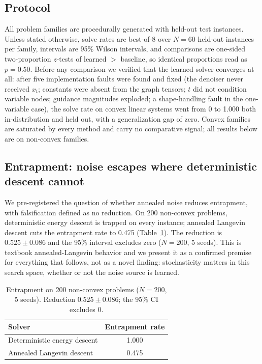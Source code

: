 \documentclass[11pt]{article}
\begin{document}
\subsection{Protocol}

All problem families are procedurally generated with held-out test instances. Unless stated
otherwise, solve rates are best-of-8 over $N = 60$ held-out instances per family, intervals
are 95\% Wilson intervals, and comparisons are one-sided two-proportion $z$-tests of
learned $>$ baseline, so identical proportions read as $p = 0.50$. Before any
comparison we verified that the learned solver converges at all: after five implementation
faults were found and fixed (the denoiser never received $x_t$; constants were absent from the
graph tensors; $t$ did not condition variable nodes; guidance magnitudes exploded; a
shape-handling fault in the one-variable case), the solve rate on convex linear systems went
from 0 to 1.000 both in-distribution and held out, with a generalization gap of zero. Convex
families are saturated by every method and carry no comparative signal; all results below are
on non-convex families.

\subsection{Entrapment: noise escapes where deterministic descent cannot}
\label{sec:entrapment}

We pre-registered the question of whether annealed noise reduces entrapment, with
falsification defined as no reduction. On 200 non-convex problems, deterministic energy
descent is trapped on every instance; annealed Langevin descent cuts the entrapment rate to
0.475 (Table~\ref{tab:entrapment}). The reduction is $0.525 \pm 0.086$ and the 95\% interval
excludes zero ($N = 200$, 5 seeds). This is textbook annealed-Langevin behavior and we present
it as a confirmed premise for everything that follows, not as a novel finding: stochasticity
matters in this search space, whether or not the noise source is learned.

\begin{table}[t]
\centering
\caption{Entrapment on 200 non-convex problems ($N = 200$, 5 seeds). Reduction
$0.525 \pm 0.086$; the 95\% CI excludes 0.}
\label{tab:entrapment}
\begin{tabular}{lc}
\toprule
Solver & Entrapment rate \\
\midrule
Deterministic energy descent & 1.000 \\
Annealed Langevin descent    & 0.475 \\
\bottomrule
\end{tabular}
\end{table}
\end{document}
